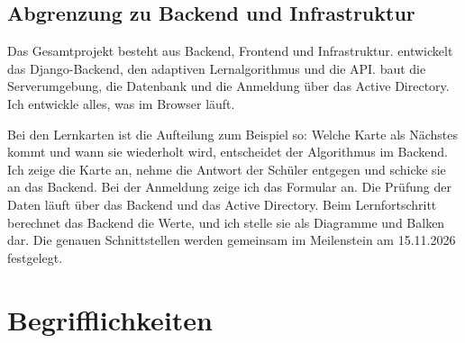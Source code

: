 \subsection{Abgrenzung zu Backend und Infrastruktur}
 
Das Gesamtprojekt besteht aus Backend, Frontend und Infrastruktur. \Luca entwickelt das Django-Backend, den adaptiven Lernalgorithmus und die API. \Jai baut die Serverumgebung, die Datenbank und die Anmeldung über das Active Directory. Ich entwickle alles, was im Browser läuft.
 

Bei den Lernkarten ist die Aufteilung zum Beispiel so: Welche Karte als Nächstes kommt und wann sie wiederholt wird, entscheidet der Algorithmus im Backend. Ich zeige die Karte an, nehme die Antwort der Schüler entgegen und schicke sie an das Backend. Bei der Anmeldung zeige ich das Formular an. Die Prüfung der Daten läuft über das Backend und das Active Directory. Beim Lernfortschritt berechnet das Backend die Werte, und ich stelle sie als Diagramme und Balken dar. Die genauen Schnittstellen werden gemeinsam im Meilenstein am 15.11.2026 festgelegt.
 
\section{Begrifflichkeiten}
\label{sec:begriffe-frontend}
 
